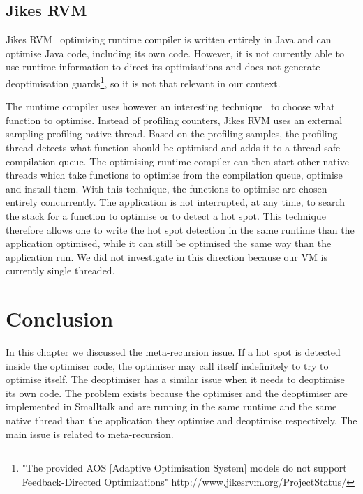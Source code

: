 \documentclass[a4paper,12pt,twoside]{../includes/ThesisStyle}
\begin{document}
\subsection{Jikes RVM}

Jikes RVM~\cite{Alp99a,Arn00} optimising runtime compiler is written entirely in Java and can optimise Java code, including its own code. However, it is not currently able to use runtime information to direct its optimisations and does not generate deoptimisation guards\footnote{"The provided AOS [Adaptive Optimisation System] models do not support Feedback-Directed Optimizations" http://www.jikesrvm.org/ProjectStatus/}, so it is not that relevant in our context. 

The runtime compiler uses however an interesting technique~\cite{Arn00} to choose what function to optimise. Instead of profiling counters, Jikes RVM uses an external sampling profiling native thread. Based on the profiling samples, the profiling thread detects what function should be optimised and adds it to a thread-safe compilation queue. The optimising runtime compiler can then start other native threads which take functions to optimise from the compilation queue, optimise and install them. With this technique, the functions to optimise are chosen entirely concurrently. The application is not interrupted, at any time, to search the stack for a function to optimise or to detect a hot spot. This technique therefore allows one to write the hot spot detection in the same runtime than the application optimised, while it can still be optimised the same way than the application run. We did not investigate in this direction because our VM is currently single threaded.


\section*{Conclusion}

In this chapter we discussed the meta-recursion issue. If a hot spot is detected inside the optimiser code, the optimiser may call itself indefinitely to try to optimise itself. The deoptimiser has a similar issue when it needs to deoptimise its own code. The problem exists because the optimiser and the deoptimiser are implemented in Smalltalk and are running in the same runtime and the same native thread than the application they optimise and deoptimise respectively. The main issue is related to meta-recursion.
\end{document}
